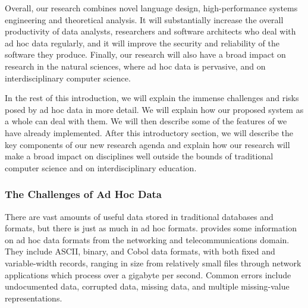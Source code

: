 \documentclass[11pt]{article}
\begin{document}
Overall, our research combines novel language design, high-performance
systems engineering and theoretical analysis.  It will substantially
increase the overall productivity of data analysts, researchers and
software architects who deal with ad hoc data regularly, and it will
improve the security and reliability of the software they produce.
Finally, our research will also have a broad impact on research in the
natural sciences, where ad hoc data is pervasive, and on
interdisciplinary computer science.

In the rest of this introduction, we will explain the immense
challenges and risks posed by ad hoc data in more detail.  We will
explain how our proposed system as a whole can deal with them.  We
will then describe some of the features of \pads{} we have already
implemented.  After this introductory section, we will describe the
key components of our new research agenda and explain how our research
will make a broad impact on disciplines well outside the bounds of
traditional computer science and on interdisciplinary education.

\subsubsection{The Challenges of Ad Hoc Data}

There are vast amounts of useful data stored in
traditional databases and \xml{} formats, but there is just as much in
ad hoc formats.   provides some information
on ad hoc data formats from the networking and telecommunications domain.  
They include ASCII, binary, and Cobol data formats, with
both fixed and variable-width records, ranging in size from
relatively small files through network applications which process over
a gigabyte per second.  Common errors include undocumented data,
corrupted data, missing data, and multiple missing-value
representations.
\end{document}
